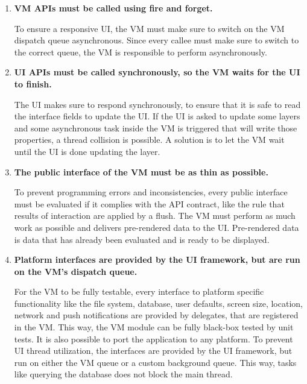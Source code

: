 \begin{enumerate}
	It is important for the internal logic implementation to strictly set the according flags on changes.
	The layouter must set the frame flag, but only if the layout frame actually changed.
	Sub-layered layers must set their sublayer flag, if they decide to reload their layer on a database change.
	
	\item \textbf{\ac{VM} \acp{API} must be called using fire and forget.}
	
	To ensure a responsive \ac{UI}, the \ac{VM} must make sure to switch on the \ac{VM} dispatch queue asynchronous.
	Since every callee must make sure to switch to the correct queue, the \ac{VM} is responsible to perform asynchronously.
	
	\item \textbf{\ac{UI} \acp{API} must be called synchronously, so the \ac{VM} waits for the \ac{UI} to finish.}
	
	The \ac{UI} makes sure to respond synchronously, to ensure that it is safe to read the interface fields to update the \ac{UI}.
	If the \ac{UI} is asked to update some layers and some asynchronous task inside the \ac{VM} is triggered that will write those properties, a thread collision is possible.
	A solution is to let the \ac{VM} wait until the \ac{UI} is done updating the layer.
	
	\item \textbf{The public interface of the \ac{VM} must be as thin as possible.}
	
	To prevent programming errors and inconsistencies, every public interface must be evaluated if it complies with the \ac{API} contract, like the rule that results of interaction are applied by a flush.
	The \ac{VM} must perform as much work as possible and delivers pre-rendered data to the \ac{UI}.
	Pre-rendered data is data that has already been evaluated and is ready to be displayed.
	
	\item \textbf{Platform interfaces are provided by the \ac{UI} framework, but are run on the \ac{VM}'s dispatch queue.}
	
	For the \ac{VM} to be fully testable, every interface to platform specific functionality like the file system, database, user defaults, screen size, location, network and push notifications are provided by delegates, that are registered in the \ac{VM}.
	This way, the \ac{VM} module can be fully black-box tested by unit tests.
	It is also possible to port the application to any platform.
	To prevent \ac{UI} thread utilization, the interfaces are provided by the \ac{UI} framework, but run on either the \ac{VM} queue or a custom background queue.
	This way, tasks like querying the database does not block the main thread.
	

\end{enumerate}
